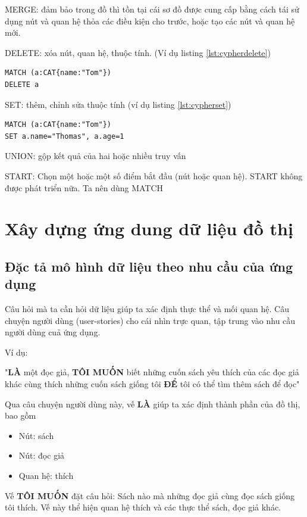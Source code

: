 MERGE: đảm bảo trong đồ thì tồn tại cái sơ đồ được cung cấp bằng cách tái sử dụng nút và quan hệ thỏa các điều kiện cho trước, hoặc tạo các nút và quan hệ mới. 

DELETE: xóa nút, quan hệ, thuộc tính. (Ví dụ listing \ref{lst:cypherdelete})
\begin{lstlisting}[caption={Cypher xóa}, label={lst:cypherdelete}]
MATCH (a:CAT{name:"Tom"})
DELETE a
\end{lstlisting}

SET: thêm, chỉnh sửa thuộc tính (ví dụ listing \ref{lst:cypherset})
\begin{lstlisting}[caption={Cypher sửa}, label={lst:cypherset}]
MATCH (a:CAT{name:"Tom"})
SET a.name="Thomas", a.age=1
\end{lstlisting}

UNION: gộp kết quả của hai hoặc nhiều truy vấn 

START: Chọn một hoặc một số điểm bắt đầu (nút hoặc quan hệ). START không được phát triển nữa. Ta nên dùng MATCH 

\section{Xây dựng ứng dung dữ liệu đồ thị}

\subsection{Đặc tả mô hình dữ liệu theo nhu cầu của ứng dụng} \cite{robinson2013graph}

Câu hỏi mà ta cần hỏi dữ liệu giúp ta xác định thực thể và mối quan hệ. Câu chuyện người dùng (user-stories) cho cái nhìn trực quan, tập trung vào nhu cầu người dùng cuả ứng dụng. 

Ví dụ: 

"\textbf{LÀ} một đọc giả, \textbf{TÔI MUỐN} biết những cuốn sách yêu thích của các đọc giả khác cùng thích những cuốn sách giống tôi \textbf{ĐỂ} tôi có thể tìm thêm sách để đọc"

Qua câu chuyện người dùng này, vế \textbf{LÀ} giúp ta xác định thành phần của đồ thị, bao gồm 

\begin{itemize}
\item Nút: sách  
\item Nút: đọc giả 
\item Quan hệ: thích  
\end{itemize}

Vế \textbf{TÔI MUỐN} đặt câu hỏi: Sách nào mà những đọc giả cùng đọc sách giống tôi thích. Vế này thể hiện quan hệ thích  và các thực thể sách, đọc giả khác.

